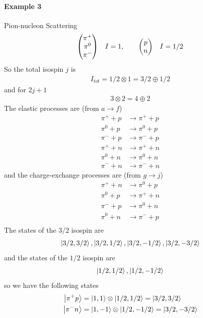 \documentclass[../main.tex]{subfiles}
\begin{document}
\paragraph{Example 3} Pion-nucleon Scattering
\begin{align*}
    \mqty(\pi^+ \\ \pi^0 \\ \pi^-) \quad I = 1, \qquad
    \mqty(p \\ n) \quad I = 1/2
\end{align*}
So the total isospin $j$ is 
\begin{align*}
    I_{tot} = 1/2 \otimes 1 = 3/2 \oplus 1/2
\end{align*}
and for $2j + 1$
\begin{align*}
    3 \otimes 2 = 4 \oplus 2
\end{align*}
The elastic processes are (from $a \to f$)
\begin{align*}
    \pi^+ + p &\rightarrow \pi^+ + p \\
    \pi^0 + p &\rightarrow \pi^0 + p \\
    \pi^- + p &\rightarrow \pi^- + p \\
    \pi^+ + n &\rightarrow \pi^+ + n \\
    \pi^0 + n &\rightarrow \pi^0 + n \\
    \pi^- + n &\rightarrow \pi^- + n
\end{align*}
and the charge-exchange processes are (from $g \to j$)
\begin{align*}
    \pi^+ + n &\to \pi^0 + p \\
    \pi^0 + p &\to \pi^+ + n \\
    \pi^- + p &\to \pi^0 + n \\
    \pi^0 + n &\to \pi^- + p \\
\end{align*}
The states of the $3/2$ isospin are
\begin{align*}
    \ket{3/2, 3/2}, \ket{3/2, 1/2}, \ket{3/2, -1/2}, \ket{3/2, -3/2}
\end{align*}
and the states of the $1/2$ isospin are
\begin{align*}
    \ket{1/2, 1/2}, \ket{1/2, -1/2}
\end{align*}
so we have the following states
\begin{align*}
    \ket{\pi^+ p} &= \ket{1,1} \otimes \ket{1/2, 1/2} = \ket{3/2, 3/2} \\
    \ket{\pi^- n} &= \ket{1,-1} \otimes \ket{1/2, -1/2} = \ket{3/2, -3/2} \\
\end{align*}
\end{document}
